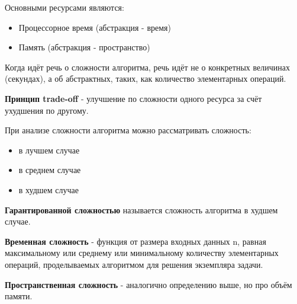 Основными ресурсами являются:
\begin{itemize}
    \item Процессорное время (абстракция - время) 
    \item Память (абстракция - пространство)
\end{itemize}

\begin{notice}
    Когда идёт речь о сложности алгоритма, речь идёт не о конкретных величинах (секундах), а об абстрактных, таких, как количество элементарных операций.
\end{notice}

\begin{definition}
    \textbf{Принцип trade-off} - улучшение по сложности одного ресурса за счёт ухудшения по другому.
\end{definition}

При анализе сложности алгоритма можно рассматривать сложность:
\begin{itemize}
    \item в лучшем случае
    \item в среднем случае
    \item в худшем случае
\end{itemize}

\begin{definition}
    \textbf{Гарантированной сложностью} называется сложность алгоритма в худшем случае.
\end{definition}

\begin{definition}
    \textbf{Временная сложность} - функция от размера входных данных n, равная максимальному или среднему или минимальному количеству элементарных операций, проделываемых алгоритмом для решения экземпляра задачи.
\end{definition}
\begin{definition}
    \textbf{Пространственная сложность} - аналогично определению выше, но про объём памяти.
\end{definition}